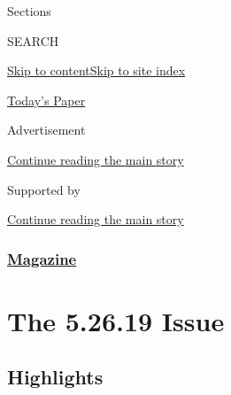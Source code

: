 Sections

SEARCH

\protect\hyperlink{site-content}{Skip to
content}\protect\hyperlink{site-index}{Skip to site index}

\href{https://myaccount.nytimes3xbfgragh.onion/auth/login?response_type=cookie\&client_id=vi}{}

\href{https://www.nytimes3xbfgragh.onion/section/todayspaper}{Today's
Paper}

Advertisement

\protect\hyperlink{after-top}{Continue reading the main story}

Supported by

\protect\hyperlink{after-sponsor}{Continue reading the main story}

\hypertarget{magazine}{%
\subsubsection{\texorpdfstring{\href{/section/magazine}{Magazine}}{Magazine}}\label{magazine}}

\hypertarget{the-52619-issue}{%
\section{The 5.26.19 Issue}\label{the-52619-issue}}

\hypertarget{highlights}{%
\subsection{Highlights}\label{highlights}}

